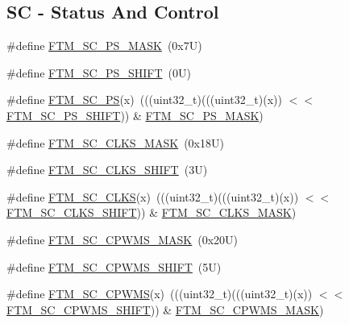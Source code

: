 \subsection*{SC -\/ Status And Control}
\begin{DoxyCompactItemize}
\item 
\#define \mbox{\hyperlink{group___f_t_m___register___masks_ga6d12f2131f28899f9d18b8e7fe12349f}{F\+T\+M\+\_\+\+S\+C\+\_\+\+P\+S\+\_\+\+M\+A\+SK}}~(0x7\+U)
\item 
\#define \mbox{\hyperlink{group___f_t_m___register___masks_ga8c61fdf29e7bfcc3b61c9b3cc86019b6}{F\+T\+M\+\_\+\+S\+C\+\_\+\+P\+S\+\_\+\+S\+H\+I\+FT}}~(0\+U)
\item 
\#define \mbox{\hyperlink{group___f_t_m___register___masks_ga065038b692ab15f728ec344376d66c5b}{F\+T\+M\+\_\+\+S\+C\+\_\+\+PS}}(x)~(((uint32\+\_\+t)(((uint32\+\_\+t)(x)) $<$$<$ \mbox{\hyperlink{group___f_t_m___register___masks_ga8c61fdf29e7bfcc3b61c9b3cc86019b6}{F\+T\+M\+\_\+\+S\+C\+\_\+\+P\+S\+\_\+\+S\+H\+I\+FT}})) \& \mbox{\hyperlink{group___f_t_m___register___masks_ga6d12f2131f28899f9d18b8e7fe12349f}{F\+T\+M\+\_\+\+S\+C\+\_\+\+P\+S\+\_\+\+M\+A\+SK}})
\item 
\#define \mbox{\hyperlink{group___f_t_m___register___masks_ga4a0ff5e0b4f7181e51e0139abfa6d7d3}{F\+T\+M\+\_\+\+S\+C\+\_\+\+C\+L\+K\+S\+\_\+\+M\+A\+SK}}~(0x18\+U)
\item 
\#define \mbox{\hyperlink{group___f_t_m___register___masks_ga9c8973dcfd297dfda1f057c14e1deb4b}{F\+T\+M\+\_\+\+S\+C\+\_\+\+C\+L\+K\+S\+\_\+\+S\+H\+I\+FT}}~(3\+U)
\item 
\#define \mbox{\hyperlink{group___f_t_m___register___masks_ga4c0b108bf05899c019de06f311cb5c89}{F\+T\+M\+\_\+\+S\+C\+\_\+\+C\+L\+KS}}(x)~(((uint32\+\_\+t)(((uint32\+\_\+t)(x)) $<$$<$ \mbox{\hyperlink{group___f_t_m___register___masks_ga9c8973dcfd297dfda1f057c14e1deb4b}{F\+T\+M\+\_\+\+S\+C\+\_\+\+C\+L\+K\+S\+\_\+\+S\+H\+I\+FT}})) \& \mbox{\hyperlink{group___f_t_m___register___masks_ga4a0ff5e0b4f7181e51e0139abfa6d7d3}{F\+T\+M\+\_\+\+S\+C\+\_\+\+C\+L\+K\+S\+\_\+\+M\+A\+SK}})
\item 
\#define \mbox{\hyperlink{group___f_t_m___register___masks_gaccb41101ca573d24de634c5a19d13467}{F\+T\+M\+\_\+\+S\+C\+\_\+\+C\+P\+W\+M\+S\+\_\+\+M\+A\+SK}}~(0x20\+U)
\item 
\#define \mbox{\hyperlink{group___f_t_m___register___masks_ga91d4d626c21437a2b8b15e9a2a385727}{F\+T\+M\+\_\+\+S\+C\+\_\+\+C\+P\+W\+M\+S\+\_\+\+S\+H\+I\+FT}}~(5\+U)
\item 
\#define \mbox{\hyperlink{group___f_t_m___register___masks_ga5215fcd780a2699aca2587695aa7d038}{F\+T\+M\+\_\+\+S\+C\+\_\+\+C\+P\+W\+MS}}(x)~(((uint32\+\_\+t)(((uint32\+\_\+t)(x)) $<$$<$ \mbox{\hyperlink{group___f_t_m___register___masks_ga91d4d626c21437a2b8b15e9a2a385727}{F\+T\+M\+\_\+\+S\+C\+\_\+\+C\+P\+W\+M\+S\+\_\+\+S\+H\+I\+FT}})) \& \mbox{\hyperlink{group___f_t_m___register___masks_gaccb41101ca573d24de634c5a19d13467}{F\+T\+M\+\_\+\+S\+C\+\_\+\+C\+P\+W\+M\+S\+\_\+\+M\+A\+SK}})
$$
\end{DoxyCompactItemize}
